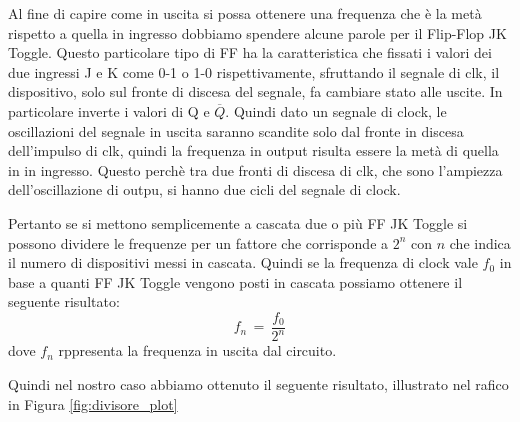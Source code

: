 Al fine di capire come in uscita si possa ottenere una frequenza che è la metà rispetto a quella in ingresso dobbiamo spendere alcune parole per il Flip-Flop JK Toggle. Questo particolare tipo di FF ha la caratteristica che fissati i valori dei due ingressi J e K come 0-1 o 1-0 rispettivamente, sfruttando il segnale di clk, il dispositivo, solo sul fronte di discesa del segnale, fa cambiare stato alle uscite. In particolare inverte i valori di Q e $\overline{Q}$. Quindi dato un segnale di clock, le oscillazioni del segnale in uscita saranno scandite solo dal fronte in discesa dell'impulso di clk, quindi la frequenza in output risulta essere la metà di quella in in ingresso. Questo perchè tra due fronti di discesa di clk, che sono l'ampiezza dell'oscillazione di outpu, si hanno due cicli del segnale di clock.

Pertanto se si mettono semplicemente a cascata due o più FF JK Toggle si possono dividere le frequenze per un fattore che corrisponde a $2^n$ con $n$ che indica il numero di dispositivi messi in cascata. Quindi se la frequenza di clock vale $f_0$ in base a quanti FF JK Toggle vengono posti in cascata possiamo ottenere il seguente risultato:
\begin{equation}
	f_n\,=\,\frac{f_0}{2^n}
\end{equation}
dove $f_n$ rppresenta la frequenza in uscita dal circuito.

Quindi nel nostro caso abbiamo ottenuto il seguente risultato, illustrato nel rafico in Figura \ref{fig:divisore_plot}




